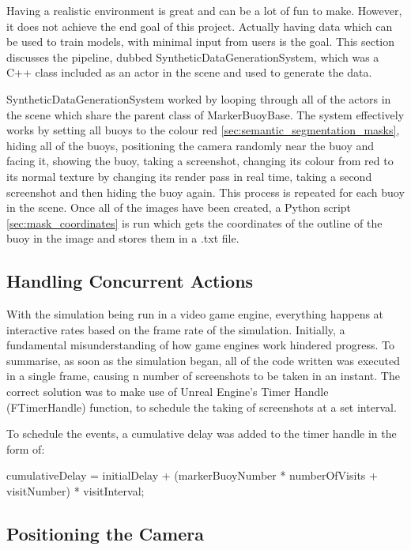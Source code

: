 \documentclass[10pt,twocolumn,letterpaper]{article}
\begin{document}
Having a realistic environment is great and can be a lot of fun to make. However, it does not achieve the end goal of this project. Actually having data which can be used to train models, with minimal input from users is the goal. This section discusses the pipeline, dubbed SyntheticDataGenerationSystem, which was a C++ class included as an actor in the scene and used to generate the data.

SyntheticDataGenerationSystem worked by looping through all of the actors in the scene which share the parent class of MarkerBuoyBase. The system effectively works by setting all buoys to the colour red \ref{sec:semantic_segmentation_masks}, hiding all of the buoys, positioning the camera randomly near the buoy and facing it, showing the buoy, taking a screenshot, changing its colour from red to its normal texture by changing its render pass in real time, taking a second screenshot and then hiding the buoy again. This process is repeated for each buoy in the scene. Once all of the images have been created, a Python script \ref{sec:mask_coordinates} is run which gets the coordinates of the outline of the buoy in the image and stores them in a .txt file.

\subsection{Handling Concurrent Actions} \label {sec:handling_concurrent_actions}

With the simulation being run in a video game engine, everything happens at interactive rates based on the frame rate of the simulation. Initially, a fundamental misunderstanding of how game engines work hindered progress. To summarise, as soon as the simulation began, all of the code written was executed in a single frame, causing n number of screenshots to be taken in an instant. The correct solution was to make use of Unreal Engine's Timer Handle (FTimerHandle) function, to schedule the taking of screenshots at a set interval.

To schedule the events, a cumulative delay was added to the timer handle in the form of:

cumulativeDelay = initialDelay + (markerBuoyNumber * numberOfVisits + visitNumber) * visitInterval;
 

\subsection{Positioning the Camera} \label {sec:positioning_the_camera}
\end{document}

